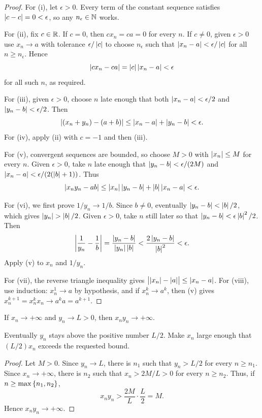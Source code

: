 \begin{proof}
    For (i), let $\epsilon>0$. Every term of the constant sequence satisfies $\left|c-c\right|=0<\epsilon$, so any $n_\epsilon\in\mathbb{N}$ works.

    For (ii), fix $c\in\mathbb{R}$. If $c=0$, then $cx_n=ca=0$ for every $n$. If $c\ne0$, given $\epsilon>0$ use $x_n\to a$ with tolerance $\epsilon/\left|c\right|$ to choose $n_\epsilon$ such that $\left|x_n-a\right|<\epsilon/\left|c\right|$ for all $n\geq n_\epsilon$. Hence
    \[
        \left|cx_n-ca\right|=\left|c\right|\left|x_n-a\right|<\epsilon
    \]
    for all such $n$, as required.

    For (iii), given $\epsilon>0$, choose $n$ late enough that both $\left|x_n-a\right|<\epsilon/2$ and $\left|y_n-b\right|<\epsilon/2$. Then
    \[
        \left|(x_n+y_n)-(a+b)\right|\leq\left|x_n-a\right|+\left|y_n-b\right|<\epsilon.
    \]
    For (iv), apply (ii) with $c=-1$ and then (iii).

    For (v), convergent sequences are bounded, so choose $M>0$ with $\left|x_n\right|\leq M$ for every $n$. Given $\epsilon>0$, take $n$ late enough that $\left|y_n-b\right|<\epsilon/(2M)$ and $\left|x_n-a\right|<\epsilon/(2(\left|b\right|+1))$. Thus
    \[
        \left|x_ny_n-ab\right|
        \leq\left|x_n\right|\left|y_n-b\right|+\left|b\right|\left|x_n-a\right|<\epsilon.
    \]

    For (vi), we first prove $1/y_n\to1/b$. Since $b\ne0$, eventually $\left|y_n-b\right|<\left|b\right|/2$, which gives $\abs{y_n}>\abs b/2$. Given $\epsilon>0$, take $n$ still later so that $\left|y_n-b\right|<\epsilon\left|b\right|^2/2$. Then
    \[
        \left|\frac1{y_n}-\frac1b\right|
        =\frac{\left|y_n-b\right|}{\left|y_n\right|\left|b\right|}
        <\frac{2\left|y_n-b\right|}{\left|b\right|^2}<\epsilon.
    \]
    Apply (v) to $x_n$ and $1/y_n$.

    For (vii), the reverse triangle inequality gives $\bigl|\left|x_n\right|-\left|a\right|\bigr|\leq\left|x_n-a\right|$. For (viii), use induction: $x_n^1\to a$ by hypothesis, and if $x_n^k\to a^k$, then (v) gives $x_n^{k+1}=x_n^kx_n\to a^ka=a^{k+1}$.
\end{proof}

\begin{theorem}\label{thm:infty-times-positive}
    If $x_n\to+\infty$ and $y_n\to L>0$, then $x_ny_n\to+\infty$.
\end{theorem}
\begin{idea}
    Eventually $y_n$ stays above the positive number $L/2$. Make $x_n$ large enough that $(L/2)x_n$ exceeds the requested bound.
\end{idea}
\begin{proof}
    Let $M>0$. Since $y_n\to L$, there is $n_1$ such that $y_n>L/2$ for every $n\geq n_1$. Since $x_n\to+\infty$, there is $n_2$ such that $x_n>2M/L>0$ for every $n\geq n_2$. Thus, if $n\geq\max\left\{n_1,n_2\right\}$,
    \[
        x_ny_n>\frac{2M}{L}\cdot\frac L2=M.
    \]
    Hence $x_ny_n\to+\infty$.
\end{proof}

